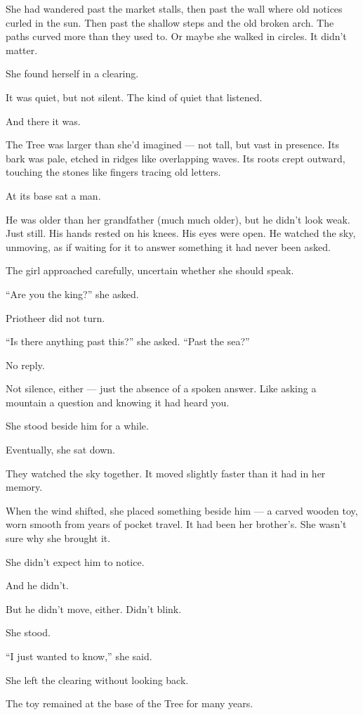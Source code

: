 \documentclass[12pt]{article}
\begin{document}
She had wandered past the market stalls, then past the wall where old notices curled in the sun. Then past the shallow steps and the old broken arch. The paths curved more than they used to. Or maybe she walked in circles. It didn’t matter.

She found herself in a clearing.

It was quiet, but not silent. The kind of quiet that listened.

And there it was.

The Tree was larger than she’d imagined — not tall, but vast in presence. Its bark was pale, etched in ridges like overlapping waves. Its roots crept outward, touching the stones like fingers tracing old letters.

At its base sat a man.

He was older than her grandfather (much much older), but he didn’t look weak. Just still. His hands rested on his knees. His eyes were open. He watched the sky, unmoving, as if waiting for it to answer something it had never been asked.

The girl approached carefully, uncertain whether she should speak.

``Are you the king?'' she asked.

Priotheer did not turn.

``Is there anything past this?'' she asked. ``Past the sea?''

No reply.

Not silence, either — just the absence of a spoken answer. Like asking a mountain a question and knowing it had heard you.

She stood beside him for a while.

Eventually, she sat down.

They watched the sky together. It moved slightly faster than it had in her memory.

When the wind shifted, she placed something beside him — a carved wooden toy, worn smooth from years of pocket travel. It had been her brother’s. She wasn’t sure why she brought it.

She didn’t expect him to notice.

And he didn’t.

But he didn’t move, either. Didn’t blink.

She stood.

``I just wanted to know,'' she said.

She left the clearing without looking back.

The toy remained at the base of the Tree for many years.
\end{document}
